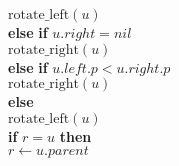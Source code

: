 \documentclass{beamer}
\newcommand{\eq}{=}
\begin{document}
\begin{frame}[shrink]
\begin{flushleft}
\hspace*{1em} \hspace*{1em} \hspace*{1em} \hspace*{1em} \ensuremath{\mathrm{rotate\_left}(\ensuremath{\mathit{u}})}\\
\hspace*{1em} \hspace*{1em} \hspace*{1em} {\color{black} \textbf{else}} {\color{black} \textbf{if}} \ensuremath{\ensuremath{\mathit{u}}.\ensuremath{\mathit{right}} \eq \ensuremath{\mathit{nil}}}\\
\hspace*{1em} \hspace*{1em} \hspace*{1em} \hspace*{1em} \ensuremath{\mathrm{rotate\_right}(\ensuremath{\mathit{u}})}\\
\hspace*{1em} \hspace*{1em} \hspace*{1em} {\color{black} \textbf{else}} {\color{black} \textbf{if}} \ensuremath{\ensuremath{\mathit{u}}.\ensuremath{\mathit{left}}.\ensuremath{\mathit{p}} < \ensuremath{\mathit{u}}.\ensuremath{\mathit{right}}.\ensuremath{\mathit{p}}}\\
\hspace*{1em} \hspace*{1em} \hspace*{1em} \hspace*{1em} \ensuremath{\mathrm{rotate\_right}(\ensuremath{\mathit{u}})}\\
\hspace*{1em} \hspace*{1em} \hspace*{1em} {\color{black} \textbf{else}} \\
\hspace*{1em} \hspace*{1em} \hspace*{1em} \hspace*{1em} \ensuremath{\mathrm{rotate\_left}(\ensuremath{\mathit{u}})}\\
\hspace*{1em} \hspace*{1em} \hspace*{1em} {\color{black} \textbf{if}} \ensuremath{\ensuremath{\mathit{r}} \eq u} {\color{black} \textbf{then}} \\
\hspace*{1em} \hspace*{1em} \hspace*{1em} \hspace*{1em} \ensuremath{\ensuremath{\mathit{r}} \gets  \ensuremath{\ensuremath{\mathit{u}}.parent}}\\
\end{flushleft}

\end{frame}
\end{document}
